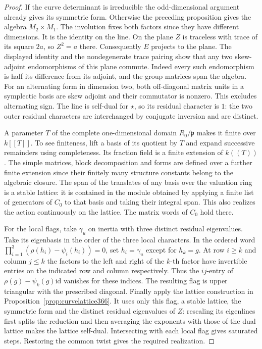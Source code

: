 \documentclass[a4paper,11pt]{article}
\theoremstyle{definition}
\theoremstyle{remark}
\numberwithin{equation}{section}
\begin{document}
\begin{proof}
If the curve determinant is irreducible the odd-dimensional
argument already gives its symmetric form. Otherwise the
preceding proposition gives the algebra \(M_2\times M_1\).
The involution fixes both factors since they have different
dimensions. It is the identity on the line. On the plane
\(Z\) is traceless with trace of its square \(2a\), so
\(Z^2=a\) there. Consequently \(E\) projects to the plane.
The displayed identity and the nondegenerate trace pairing
show that any two skew-adjoint endomorphisms of this plane
commute. Indeed every such endomorphism is half its difference
from its adjoint, and the group matrices span the algebra.
For an alternating form in dimension two, both off-diagonal
matrix units in a symplectic basis are skew adjoint and their
commutator is nonzero. This excludes alternating sign.
The line is self-dual for \(\star\), so its residual character
is \(1\): the two outer residual characters are interchanged
by conjugate inversion and are distinct.

A parameter \(T\) of the complete one-dimensional domain
\(R_0/\mathfrak p\) makes it finite over \(k[[T]]\). To see
finiteness, lift a basis of its quotient by \(T\) and expand
successive remainders using completeness. Its fraction field
is a finite extension of \(k((T))\). The simple matrices,
block decomposition and forms are defined over a further
finite extension since their finitely many structure
constants belong to the algebraic closure. The span of the
translates of any basis over the valuation ring is a stable
lattice: it is contained in the module obtained by applying
a finite list of generators of \(C_0\) to that basis and
taking their integral span. This also realizes the action
continuously on the lattice. The matrix words of \(C_0\)
hold there.

For the local flags, take \(\gamma_u\) on inertia with
three distinct residual eigenvalues. Take its eigenbasis
in the order of the three local characters. In the ordered
word \(\prod_{i=1}^3(\rho(h_i)-\psi_i(h_i))=0\), set
\(h_i=\gamma_u\) except for \(h_k=g\). At row \(i\ge k\)
and column \(j\le k\) the factors to the left and right of
the \(k\)-th factor have invertible entries on the indicated
row and column respectively. Thus the \(ij\)-entry of
\(\rho(g)-\psi_k(g)\mathrm{id}\) vanishes for these indices.
The resulting flag is upper triangular with the prescribed
diagonal. Finally apply the lattice construction in
Proposition~\ref{prop:curvelattice366}. It uses only this
flag, a stable lattice, the symmetric form and the distinct
residual eigenvalues of \(Z\): rescaling its eigenlines
first splits the reduction and then averaging the exponents
with those of the dual lattice makes the lattice self-dual.
Intersecting with each local flag gives saturated steps.
Restoring the common twist gives the required realization.
\end{proof}
\end{document}
